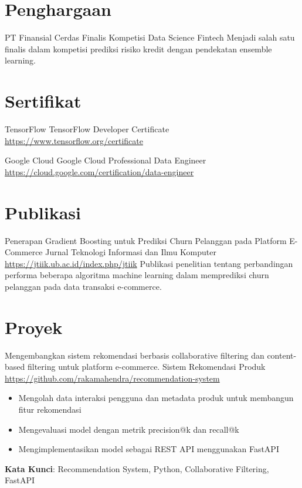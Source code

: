 \documentclass[a4paper, serif, 10pt]{moderncv}
\begin{document}
\section{Penghargaan}

        {PT Finansial Cerdas}
        {Finalis Kompetisi Data Science Fintech}
        {}
        {}
        {Menjadi salah satu finalis dalam kompetisi prediksi risiko kredit dengan pendekatan ensemble learning.}
\section{Sertifikat}

        {TensorFlow}
        {TensorFlow Developer Certificate}
        {\url{https://www.tensorflow.org/certificate}}
        {}
        {}

        {Google Cloud}
        {Google Cloud Professional Data Engineer}
        {\url{https://cloud.google.com/certification/data-engineer}}
        {}
        {}
\section{Publikasi}

        {Penerapan Gradient Boosting untuk Prediksi Churn Pelanggan pada Platform E-Commerce}
        {Jurnal Teknologi Informasi dan Ilmu Komputer}
        {\url{https://jtiik.ub.ac.id/index.php/jtiik}}
        {}
        {Publikasi penelitian tentang perbandingan performa beberapa algoritma machine learning dalam memprediksi churn pelanggan pada data transaksi e-commerce.}
\section{Proyek}

        {Mengembangkan sistem rekomendasi berbasis collaborative filtering dan content-based filtering untuk platform e-commerce.
}
        {Sistem Rekomendasi Produk}
        {\url{https://github.com/rakamahendra/recommendation-system}}
        {}
        {\begin{itemize}
\item Mengolah data interaksi pengguna dan metadata produk untuk membangun fitur rekomendasi
\item Mengevaluasi model dengan metrik precision@k dan recall@k
\item Mengimplementasikan model sebagai REST API menggunakan FastAPI
\end{itemize}
\textbf{Kata Kunci}: Recommendation System, Python, Collaborative Filtering, FastAPI}
\end{document}
